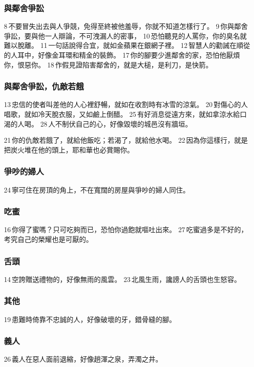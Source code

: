 \subsubsection{與鄰舍爭訟}
8 不要冒失出去與人爭競，免得至終被他羞辱，你就不知道怎樣行了。 9 你與鄰舍爭訟，要與他一人辯論，不可洩漏人的密事， 10 恐怕聽見的人罵你，你的臭名就難以脫離。 11 一句話說得合宜，就如金蘋果在銀網子裡。 12 智慧人的勸誡在順從的人耳中，好像金耳環和精金的裝飾。 
17 你的腳要少進鄰舍的家，恐怕他厭煩你，恨惡你。 18 作假見證陷害鄰舍的，就是大槌，是利刀，是快箭。

\subsubsection{與鄰舍爭訟，仇敵若餓}
13 忠信的使者叫差他的人心裡舒暢，就如在收割時有冰雪的涼氣。
20 對傷心的人唱歌，就如冷天脫衣服，又如鹼上倒醋。 
25 有好消息從遠方來，就如拿涼水給口渴的人喝。 
28 人不制伏自己的心，好像毀壞的城邑沒有牆垣。

21 你的仇敵若餓了，就給他飯吃；若渴了，就給他水喝。 
22 因為你這樣行，就是把炭火堆在他的頭上，耶和華也必賞賜你。

\subsubsection{爭吵的婦人}
 24 寧可住在房頂的角上，不在寬闊的房屋與爭吵的婦人同住。 

\subsubsection{吃蜜}
16 你得了蜜嗎？只可吃夠而已，恐怕你過飽就嘔吐出來。  
27 吃蜜過多是不好的，考究自己的榮耀也是可厭的。 

\subsubsection{舌頭}
14 空誇贈送禮物的，好像無雨的風雲。  
23 北風生雨，讒謗人的舌頭也生怒容。 

\subsubsection{其他}
19 患難時倚靠不忠誠的人，好像破壞的牙，錯骨縫的腳。 

\subsubsection{義人}
26 義人在惡人面前退縮，好像趟渾之泉，弄濁之井。 




